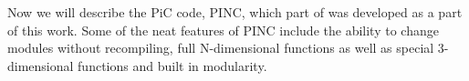 	Now we will describe the PiC code, PINC, which part of was developed as
	a part of this work. Some of the neat features of PINC include the ability
	to change modules without recompiling, full N-dimensional functions as well
	as special 3-dimensional functions and built in modularity.
